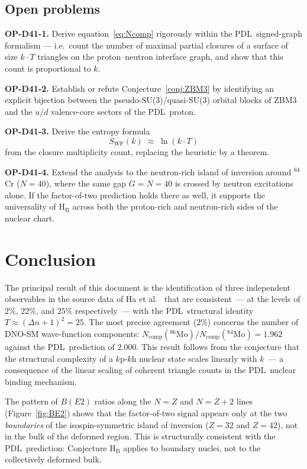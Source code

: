 \documentclass[11pt,a4paper]{article}
\theoremstyle{definition}
\newcommand{\PDL}{\textnormal{PDL}}
\newcommand{\Dn}{\Delta n}
\newcommand{\Ncomp}{N_{\mathrm{comp}}}
\newcommand{\Swf}{S_{\mathrm{WF}}}
\newcommand{\Tpdl}{T}
\newcommand{\kph}{k\text{p-}k\text{h}}
\begin{document}
\subsection{Open problems}

\textbf{OP-D41-1.} Derive equation~\eqref{eq:Ncomp} rigorously within the
\PDL\ signed-graph formalism --- i.e.\ count the number of maximal partial
closures of a surface of size $k\cdot\Tpdl$ triangles on the
proton--neutron interface graph, and show that this count is proportional
to $k$.

\textbf{OP-D41-2.} Establish or refute Conjecture~\ref{conj:ZBM3} by
identifying an explicit bijection between the pseudo-SU(3)/quasi-SU(3)
orbital blocks of ZBM3 and the $u/d$ valence-core sectors of the \PDL\
proton.

\textbf{OP-D41-3.} Derive the entropy formula
\begin{equation}
  \Swf(k) \;\approx\; \ln(k\cdot\Tpdl)
  \label{eq:S_PDL}
\end{equation}
from the closure multiplicity count, replacing the heuristic by a theorem.

\textbf{OP-D41-4.} Extend the analysis to the neutron-rich island of
inversion around $^{64}$Cr ($N=40$), where the same gap $G=N=40$ is crossed
by neutron excitations alone. If the factor-of-two prediction holds there as
well, it supports the universality of H$_\mathrm{B}$ across both the
proton-rich and neutron-rich sides of the nuclear chart.

\section*{Conclusion}

The principal result of this document is the identification of three
independent observables in the source data of Ha et al.~\cite{Ha_2025}
that are consistent~--- at the levels of $2\%$, $22\%$, and $25\%$
respectively~--- with the \PDL\ structural identity
$\Tpdl \approx (\Dn+1)^2 = 25$.
The most precise agreement ($2\%$) concerns the number of DNO-SM wave-function
components:
$\Ncomp(^{86}\text{Mo})/\Ncomp(^{84}\text{Mo}) = 1.962$
against the \PDL\ prediction of $2.000$.
This result follows from the conjecture that the structural complexity of a
$\kph$ nuclear state scales linearly with $k$~--- a consequence of the
linear scaling of coherent triangle counts in the \PDL\ nuclear binding
mechanism.

The pattern of $B(E2)$ ratios along the $N=Z$ and $N=Z+2$ lines
(Figure~\ref{fig:BE2}) shows that the factor-of-two signal appears only at
the two \emph{boundaries} of the isospin-symmetric island of inversion
($Z=32$ and $Z=42$), not in the bulk of the deformed region. This is
structurally consistent with the \PDL\ prediction: Conjecture H$_\mathrm{B}$
applies to boundary nuclei, not to the collectively deformed bulk.
\end{document}
